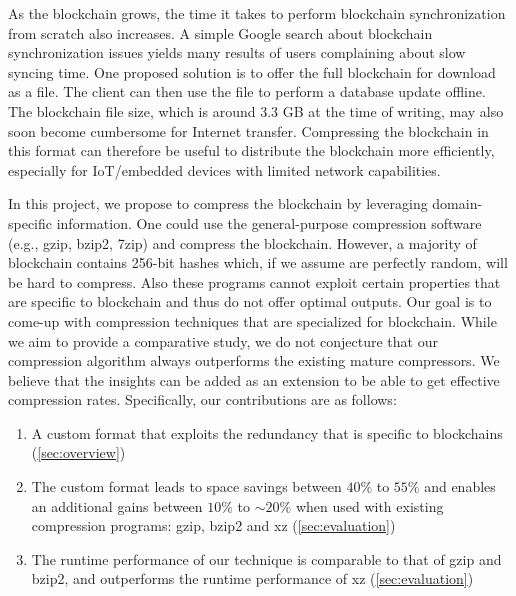 As the blockchain grows, the time it takes to perform blockchain synchronization from scratch also increases.
A simple Google search about \eth{} blockchain synchronization issues yields many results of users complaining about slow syncing time.
One proposed solution is to offer the full blockchain for download as a file.
The client can then use the file to perform a database update offline.
The blockchain file size, which is around 3.3 GB at the time of writing, may also soon become cumbersome for Internet transfer.
Compressing the blockchain in this format can therefore be useful to distribute the blockchain more efficiently,
especially for IoT/embedded devices with limited network capabilities.

In this project, we propose to compress the \eth{} blockchain by leveraging domain-specific information.
One could use the general-purpose compression software (e.g., gzip, bzip2, 7zip) and compress the blockchain.
However, a majority of blockchain contains 256-bit hashes which, if we assume are perfectly random, will be hard to compress.
Also these programs cannot exploit certain properties that are specific to blockchain and thus do not offer optimal outputs.
Our goal is to come-up with compression techniques that  are specialized for blockchain.
While we aim to provide a comparative study, we do not conjecture that our compression algorithm always outperforms the
existing mature compressors.
We believe that the insights can be added as an extension to be able to get effective compression rates.
Specifically, our contributions are as follows:
\begin{enumerate}
	\item A custom format that exploits the redundancy that is specific to blockchains (\autoref{sec:overview}) 
	\item The custom format leads to space savings between $40\%$ to $55\%$ and enables an additional gains between $10\%$ to $\sim 20\%$ when used with existing compression programs: gzip, bzip2 and xz (\autoref{sec:evaluation})
	\item The runtime performance of our technique is comparable to that of gzip and bzip2, and outperforms the runtime performance of xz (\autoref{sec:evaluation})
\end{enumerate}

